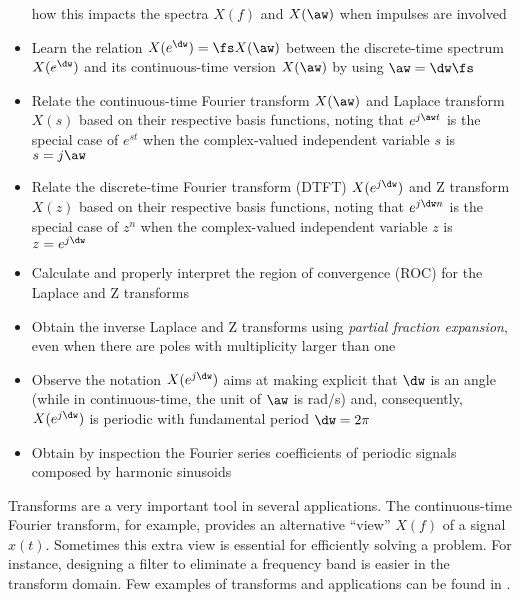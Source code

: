 \begin{itemize}
				how this impacts the spectra $X(f)$ and $X(\aw)$ when impulses are involved
				\item Learn the relation $X(e^{\dw}) = \fs X(\aw)$ between the discrete-time spectrum $X(e^{\dw})$ and its continuous-time version $X(\aw)$ by using $\aw = \dw \fs$
				\item Relate the continuous-time Fourier transform $X(\aw)$ and Laplace transform $X(s)$ based on their respective basis functions, noting that $e^{j \aw t}$ is the special case of $e^{st}$ when the complex-valued independent variable $s$ is $s = j \aw$
				\item Relate the discrete-time Fourier transform (DTFT) $X(e^{j \dw})$ and Z transform $X(z)$ based on their respective basis functions, noting that $e^{j \dw n}$ is the special case of $z^{n}$ when the complex-valued independent variable $z$ is $z = e^{j \dw}$
				\item Calculate and properly interpret the region of convergence (ROC) for the Laplace and Z transforms
				\item Obtain the inverse Laplace and Z transforms using \emph{partial fraction expansion}, even when there are poles with
				multiplicity larger than one
				\item Observe the notation $X(e^{j \dw})$ aims at making explicit that $\dw$ is an angle (while in continuous-time, the unit of $\aw$ is rad/s) and, consequently, $X(e^{j \dw})$ is periodic with fundamental period $\dw = 2 \pi$
				\item Obtain by inspection the Fourier series coefficients of periodic signals composed by harmonic sinusoids
\end{itemize}


Transforms are a very important tool in several applications. The continuous-time Fourier transform, for example, provides an alternative ``view'' $X(f)$ of a signal $x(t)$. Sometimes this extra view is essential for efficiently solving a problem. For instance, designing a filter to eliminate a frequency band is easier in the transform domain. Few examples of transforms and applications can be found in .

